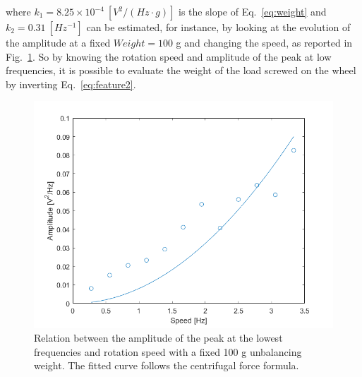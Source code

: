 \documentclass[12pt]{article}
\begin{document}
	where $k_1 = 8.25 \times 10^{−4}\ [V^2/\left( Hz \cdot g\right)]$ is the slope of Eq.~\eqref{eq:weight} and $k_2 = 0.31\ [Hz^{-1}]$ can be estimated, for instance, by looking at the evolution of the amplitude at a fixed $Weight = 100$ g and changing the speed, as reported in Fig.~\ref{fig:weightfeaturespeed}. So by knowing the rotation speed and amplitude of the peak at low frequencies, it is possible to evaluate the weight of the load screwed on the wheel by inverting Eq.~\eqref{eq:feature2}.
	\begin{figure}[h]
		\centering
		\includegraphics[width=0.9\linewidth]{Figures/WeightFeatureSpeed}
		\caption{Relation between the amplitude of the peak at the lowest frequencies and rotation speed with a fixed 100 g unbalancing weight. The fitted curve follows the centrifugal force formula.}
		\label{fig:weightfeaturespeed}
	\end{figure}
\end{document}
